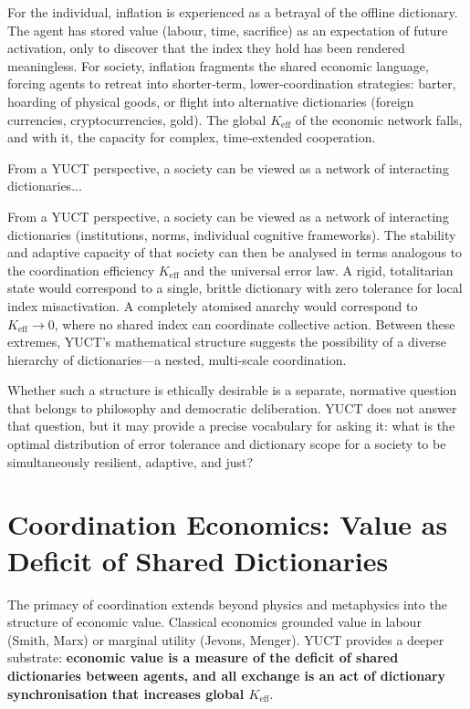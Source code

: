 \documentclass[12pt,a4paper]{article}
\begin{document}
	For the individual, inflation is experienced as a betrayal of the offline dictionary. The agent has stored value (labour, time, sacrifice) as an expectation of future activation, only to discover that the index they hold has been rendered meaningless. For society, inflation fragments the shared economic language, forcing agents to retreat into shorter‑term, lower‑coordination strategies: barter, hoarding of physical goods, or flight into alternative dictionaries (foreign currencies, cryptocurrencies, gold). The global \(K_{\mathrm{eff}}\) of the economic network falls, and with it, the capacity for complex, time‑extended cooperation.
	
	
	From a YUCT perspective, a society can be viewed as a network of interacting dictionaries...
	
	From a YUCT perspective, a society can be viewed as a network of interacting dictionaries (institutions, norms, individual cognitive frameworks). The stability and adaptive capacity of that society can then be analysed in terms analogous to the coordination efficiency \(K_{\mathrm{eff}}\) and the universal error law. A rigid, totalitarian state would correspond to a single, brittle dictionary with zero tolerance for local index misactivation. A completely atomised anarchy would correspond to \(K_{\mathrm{eff}} \to 0\), where no shared index can coordinate collective action. Between these extremes, YUCT's mathematical structure suggests the possibility of a diverse hierarchy of dictionaries---a nested, multi-scale coordination.
	
	Whether such a structure is ethically desirable is a separate, normative question that belongs to philosophy and democratic deliberation. YUCT does not answer that question, but it may provide a precise vocabulary for asking it: what is the optimal distribution of error tolerance and dictionary scope for a society to be simultaneously resilient, adaptive, and just?
	
	\section{Coordination Economics: Value as Deficit of Shared Dictionaries}
	\label{sec:coordination-economics}
	
	The primacy of coordination extends beyond physics and metaphysics into the structure of economic value. Classical economics grounded value in labour (Smith, Marx) or marginal utility (Jevons, Menger). YUCT provides a deeper substrate: \textbf{economic value is a measure of the deficit of shared dictionaries between agents, and all exchange is an act of dictionary synchronisation that increases global $K_{\mathrm{eff}}$}.
	
\end{document}
